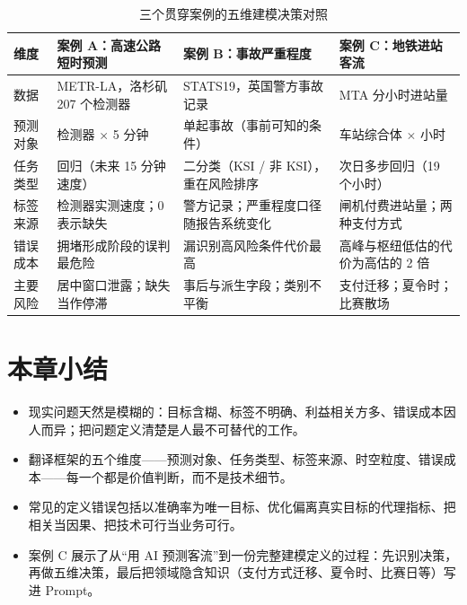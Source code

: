 \begin{table}[H]
\centering
\caption{三个贯穿案例的五维建模决策对照}
\label{tab:three_cases_modeling}
\small
\begin{tabular}{p{1.6cm}p{3.7cm}p{3.7cm}p{3.7cm}}
\toprule
维度 & 案例 A：高速公路短时预测 & 案例 B：事故严重程度 & 案例 C：地铁进站客流 \\
\midrule
数据 & METR-LA，洛杉矶 207 个检测器 & STATS19，英国警方事故记录 & MTA 分小时进站量 \\
预测对象 & 检测器 $\times$ 5 分钟 & 单起事故（事前可知的条件） & 车站综合体 $\times$ 小时 \\
任务类型 & 回归（未来 15 分钟速度） & 二分类（KSI / 非 KSI），重在风险排序 & 次日多步回归（19 个小时） \\
标签来源 & 检测器实测速度；0 表示缺失 & 警方记录；严重程度口径随报告系统变化 & 闸机付费进站量；两种支付方式 \\
错误成本 & 拥堵形成阶段的误判最危险 & 漏识别高风险条件代价最高 & 高峰与枢纽低估的代价为高估的 2 倍 \\
主要风险 & 居中窗口泄露；缺失当作停滞 & 事后与派生字段；类别不平衡 & 支付迁移；夏令时；比赛散场 \\
\bottomrule
\end{tabular}
\end{table}

\section{本章小结}

\begin{itemize}
  \item 现实问题天然是模糊的：目标含糊、标签不明确、利益相关方多、错误成本因人而异；把问题定义清楚是人最不可替代的工作。
  \item 翻译框架的五个维度——预测对象、任务类型、标签来源、时空粒度、错误成本——每一个都是价值判断，而不是技术细节。
  \item 常见的定义错误包括以准确率为唯一目标、优化偏离真实目标的代理指标、把相关当因果、把技术可行当业务可行。
  \item 案例 C 展示了从“用 AI 预测客流”到一份完整建模定义的过程：先识别决策，再做五维决策，最后把领域隐含知识（支付方式迁移、夏令时、比赛日等）写进 Prompt。
\end{itemize}

